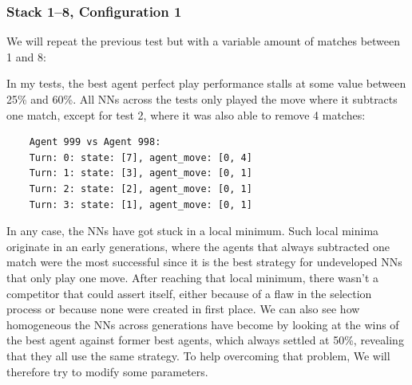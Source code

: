 \documentclass[11pt]{report}
\begin{document}
\begin{enumerate}
    \subsubsection{Stack 1--8, Configuration 1}
    We will repeat the previous test but with a variable amount of matches between 1 and 8:
    \renewcommand{\csvpath}{../data/simple_nim/stack_8r/t_1.1/stats.csv} %
    \begin{center}
    \end{center}
    In my tests, the best agent perfect play performance stalls at some value between 25\% and 60\%.
    All NNs across the tests only played the move where it subtracts one match, except for test 2, where it was also able to remove 4 matches:
    \begin{verbatim}
    Agent 999 vs Agent 998:
    Turn: 0: state: [7], agent_move: [0, 4]
    Turn: 1: state: [3], agent_move: [0, 1]
    Turn: 2: state: [2], agent_move: [0, 1]
    Turn: 3: state: [1], agent_move: [0, 1]
    \end{verbatim}
    In any case, the NNs have got stuck in a local minimum.
    Such local minima originate in an early generations, where the agents that always subtracted one match were the most successful since it is the best strategy for undeveloped NNs that only play one move.
    After reaching that local minimum, there wasn't a competitor that could assert itself, either because of a flaw in the selection process or because none were created in first place.
    We can also see how homogeneous the NNs across generations have become by looking at the wins of the best agent against former best agents, which always settled at 50\%, revealing that they all use the same strategy.
    To help overcoming that problem, We will therefore try to modify some parameters.
    

\end{enumerate}
\end{document}
